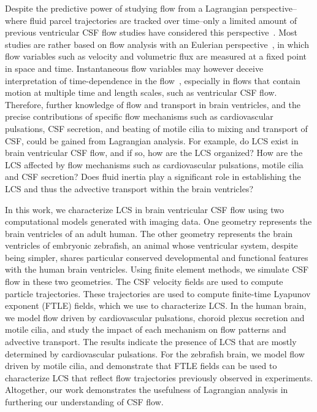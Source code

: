 \documentclass{template}
\begin{document}
Despite the predictive power of studying flow from a
Lagrangian perspective--where fluid parcel trajectories are tracked over time--only
a limited amount of previous ventricular CSF flow studies
have considered this perspective~\citep{Yoshida2022EffectVentricles}.
Most studies are rather based on flow analysis with an
Eulerian perspective~\citep{Kurtcuoglu2007ComputationalSylvius,
Causemann2022HumanFramework, howden2008three, Sweetman2011ThreeDimensional,
Siyahhan2014FlowVentricles},
in which flow variables such as velocity and volumetric flux
are measured at a fixed point in space and time.
Instantaneous flow variables may however deceive
interpretation of time-dependence in the flow~\citep{shadden2005definition},
especially in flows that contain motion at multiple time and length scales,
such as ventricular CSF flow. Therefore,
further knowledge of flow and transport in brain ventricles,
and the precise contributions of specific
flow mechanisms such as cardiovascular pulsations, CSF secretion,
and beating of motile cilia to mixing and transport of CSF,
could be gained from Lagrangian analysis.
For example, do LCS exist in brain ventricular CSF flow,
and if so, how are the LCS organized?
How are the LCS affected by flow mechanisms
such as cardiovascular pulsations, motile cilia and CSF secretion?
Does fluid inertia play a significant role in establishing the
LCS and thus the advective transport within the brain ventricles?

In this work, we characterize LCS in brain ventricular CSF flow
using two computational models generated with imaging data.
One geometry represents the brain ventricles of an adult human. The other
geometry represents the brain ventricles of embryonic zebrafish, an animal whose
ventricular system, despite being simpler, shares particular conserved
developmental and functional features with the human brain ventricles.
Using finite element methods, we simulate CSF flow
in these two geometries. The CSF velocity fields are used to
compute particle trajectories. These trajectories are used to
compute finite-time Lyapunov exponent (FTLE) fields, which
we use to characterize LCS. In the human brain, we model
flow driven by cardiovascular pulsations, choroid plexus secretion and motile cilia,
and study the impact of each mechanism on flow patterns and advective transport.
The results indicate the presence of LCS that are mostly determined
by cardiovascular pulsations. For the zebrafish brain, we model flow
driven by motile cilia, and demonstrate that FTLE fields can be
used to characterize LCS that reflect flow trajectories
previously observed in experiments. Altogether, our work demonstrates the usefulness of
Lagrangian analysis in furthering our understanding of CSF flow.
\end{document}
